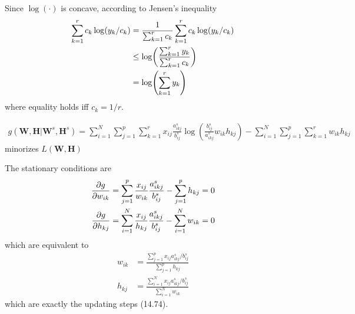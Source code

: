 \begin{exercise}
  \begin{exerciseSection}
    Since $\log(\cdot)$ is concave, according to Jensen's inequality
    \begin{align}
      \sum_{k=1}^r c_k\log(y_k/c_k) & = \frac{1}{\sum_{k=1}^rc_k}
      \sum_{k=1}^rc_k\log(y_k/c_k) \notag \\
      & \leq\log(\frac{\sum_{k=1}^ry_k}{\sum_{k=1}^rc_k}) \notag\\
      &= \log(\sum_{k=1}^ry_k)
    \end{align}
    where equality holds iff $c_k = 1 / r$.
  \end{exerciseSection}
  
  \begin{exerciseSection}
    \begin{align}
      g(\mathbf{W},\mathbf{H}|\mathbf{W}^s,\mathbf{H}^s) = \sum_{i=1}^N
      \sum_{j=1}^p \sum_{k=1}^r x_{ij}\frac{a_{ikj}^s}{b_{ij}^s}
      \log(\frac{b_{ij}^s}{a_{ikj}^s} w_{ik}h_{kj}) - \sum_{i=1}^N
      \sum_{j=1}^p \sum_{k=1}^r w_{ik}h_{kj}
    \end{align}
    minorizes $L(\mathbf{W},\mathbf{H})$
  \end{exerciseSection}
  
  \begin{exerciseSection}
    The stationary conditions are
    \begin{align}
      \pdv{g}{w_{ik}} &= \sum_{j=1}^p \frac{x_{ij}}{w_{ik}}
      \frac{a_{ikj}^s}{b_{ij}^s} - \sum_{j=1}^p h_{kj} = 0 \\
      \pdv{g}{h_{kj}} &= \sum_{i=1}^N \frac{x_{ij}}{h_{kj}}
      \frac{a_{ikj}^s}{b_{ij}^s} - \sum_{i=1}^N w_{ik} = 0
    \end{align}
    which are equivalent to
    \begin{align}
      w_{ik} &= \frac{\sum_{j=1}^px_{ij}a_{ikj}^s/b_{ij}^s} {\sum_{j=1}^p
      h_{kj}} \\
      h_{kj} &= \frac{\sum_{i=1}^Nx_{ij}a_{ikj}^s/b_{ij}^s} {\sum_{i=1}^N
      w_{ik}}
    \end{align}
    which are exactly the updating steps (14.74).
  \end{exerciseSection}
\end{exercise}

